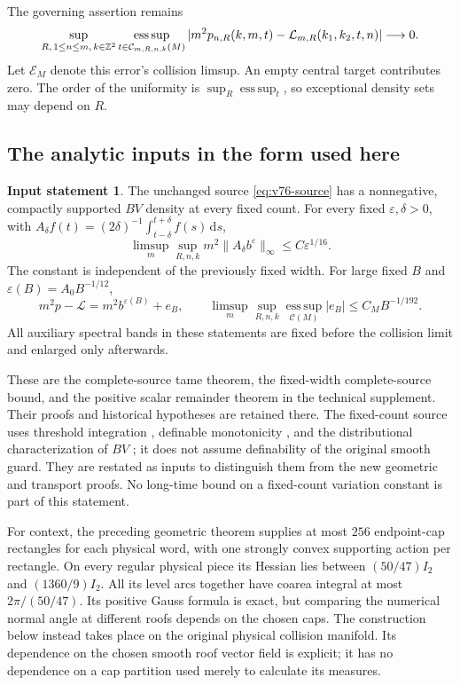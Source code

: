 \documentclass[11pt,reqno]{amsart}
\numberwithin{equation}{section}
\theoremstyle{definition}\newtheorem{definition}[theorem]{Definition}
\theoremstyle{remark}\newtheorem{remark}[theorem]{Remark}
\newcommand{\dd}{\,\mathrm d}\newcommand{\one}{\mathbf1}
\theoremstyle{definition}\newtheorem{inputstatement}[theorem]{Input statement}
\newcommand{\esssup}{\operatorname*{ess\,sup}}
\begin{document}
The governing assertion remains
\begin{equation}\label{eq:v76-target}
 \sup_{R,\,1\le n\le m,\,k\in\Z^2}
 \esssup_{t\in\mathcal C_{m,R,n,k}(M)}
 |m^2p_{n,R}(k,m,t)-\mathcal L_{m,R}(k_1,k_2,t,n)|\longrightarrow0.
\end{equation}
Let $\mathcal E_M$ denote this error's collision limsup. An empty
central target contributes zero. The order of the uniformity is
$\sup_R\esssup_t$, so exceptional density sets may depend on $R$.

\subsection{The analytic inputs in the form used here}
\begin{inputstatement}\label{input:v76-analytic}
The unchanged source \eqref{eq:v76-source} has a nonnegative,
compactly supported $BV$ density at every fixed count. For every
fixed $\varepsilon,\delta>0$, with
$A_\delta f(t)=(2\delta)^{-1}\int_{t-\delta}^{t+\delta}f(s)\dd s$,
\begin{equation}\label{eq:v76-average}
 \limsup_m\sup_{R,n,k}m^2\|A_\delta b^\varepsilon\|_\infty
                                      \le C\varepsilon^{1/16}.
\end{equation}
The constant is independent of the previously fixed width. For large
fixed $B$ and $\varepsilon(B)=A_0B^{-1/12}$,
\begin{equation}\label{eq:v76-remainder}
 m^2p-\mathcal L=m^2b^{\varepsilon(B)}+e_B,\qquad
 \limsup_m\sup_{R,n,k}\esssup_{\mathcal C(M)}|e_B|
                                     \le C_MB^{-1/192}.
\end{equation}
All auxiliary spectral bands in these statements are fixed before
the collision limit and enlarged only afterwards.
\end{inputstatement}
These are the complete-source tame theorem, the fixed-width
complete-source bound, and the positive scalar remainder theorem in
the technical supplement. Their proofs and historical hypotheses are
retained there. The fixed-count source uses threshold integration
\cite{CMInt}, definable monotonicity \cite{Coste}, and the
distributional characterization of $BV$ \cite{AFP}; it does not
assume definability of the original smooth guard. They are restated as inputs to distinguish them from
the new geometric and transport proofs. No long-time bound on a
fixed-count variation constant is part of this statement.

For context, the preceding geometric theorem supplies at most $256$
endpoint-cap rectangles for each physical word, with one strongly
convex supporting action per rectangle. On every regular physical
piece its Hessian lies between $(50/47)I_2$ and $(1360/9)I_2$.
All its level arcs together have coarea integral at most
$2\pi/(50/47)$. Its positive Gauss formula is exact, but comparing
the numerical normal angle at different roofs depends on the chosen
caps. The construction below instead takes place on the original
physical collision manifold. Its dependence on the chosen smooth
roof vector field is explicit; it has no dependence on a cap
partition used merely to calculate its measures.
\end{document}
